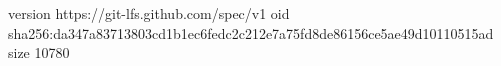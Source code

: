 version https://git-lfs.github.com/spec/v1
oid sha256:da347a83713803cd1b1ec6fedc2c212e7a75fd8de86156ce5ae49d10110515ad
size 10780
